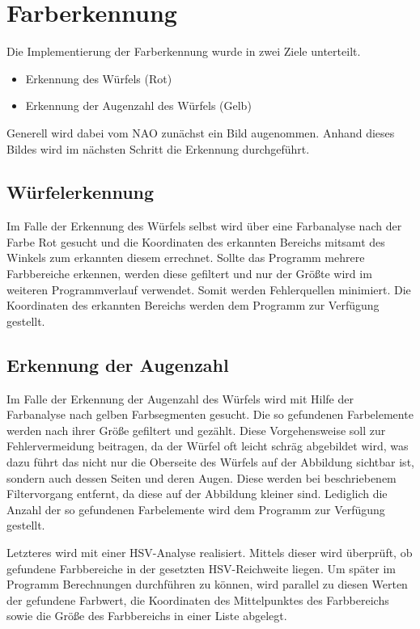 \chapter{Farberkennung}

    Die Implementierung der Farberkennung wurde in zwei Ziele unterteilt.
    \begin{itemize}
        \item Erkennung des Würfels (Rot)
        \item Erkennung der Augenzahl des Würfels (Gelb)
    \end{itemize}
    Generell wird dabei vom NAO zunächst ein Bild augenommen.
    Anhand dieses Bildes wird im nächsten Schritt die Erkennung durchgeführt.

    \section{Würfelerkennung}

        Im Falle der Erkennung des Würfels selbst wird über eine Farbanalyse
        nach der Farbe Rot gesucht und die Koordinaten des erkannten Bereichs
        mitsamt des Winkels zum erkannten diesem errechnet.
        Sollte das Programm mehrere Farbbereiche erkennen, werden diese
        gefiltert und nur der Größte wird im weiteren Programmverlauf verwendet.
        Somit werden Fehlerquellen minimiert.
        Die Koordinaten des erkannten Bereichs werden dem Programm zur Verfügung
        gestellt.

    \section{Erkennung der Augenzahl}

        Im Falle der Erkennung der Augenzahl des Würfels wird mit Hilfe der
        Farbanalyse nach gelben Farbsegmenten gesucht.
        Die so gefundenen Farbelemente werden nach ihrer Größe gefiltert und
        gezählt.
        Diese Vorgehensweise soll zur Fehlervermeidung beitragen, da der Würfel
        oft leicht schräg abgebildet wird, was dazu führt das nicht nur die
        Oberseite des Würfels auf der Abbildung sichtbar ist, sondern auch
        dessen Seiten und deren Augen.
        Diese werden bei beschriebenem Filtervorgang entfernt, da diese auf der
        Abbildung kleiner sind.
        Lediglich die Anzahl der so gefundenen Farbelemente wird dem Programm
        zur Verfügung gestellt.

        Letzteres wird mit einer \ac{HSV}-Analyse realisiert.
        Mittels dieser wird überprüft, ob gefundene Farbbereiche in der
        gesetzten \ac{HSV}-Reichweite liegen.
        Um später im Programm Berechnungen durchführen zu können, wird parallel
        zu diesen Werten der gefundene Farbwert, die Koordinaten des
        Mittelpunktes des Farbbereichs sowie die Größe des Farbbereichs in einer
        Liste abgelegt.

